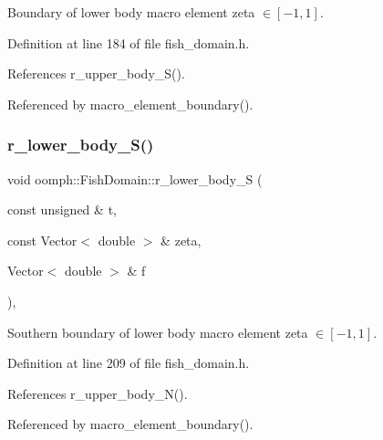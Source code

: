 Boundary of lower body macro element zeta $ \in [-1,1] $. 



Definition at line 184 of file fish\+\_\+domain.\+h.



References r\+\_\+upper\+\_\+body\+\_\+\+S().



Referenced by macro\+\_\+element\+\_\+boundary().

\mbox{\label{classoomph_1_1FishDomain_aa33b19ceef5cd574ee0a6756bcfc6da7}} 
\subsubsection{\texorpdfstring{r\+\_\+lower\+\_\+body\+\_\+\+S()}{r\_lower\_body\_S()}}
{\footnotesize\ttfamily void oomph\+::\+Fish\+Domain\+::r\+\_\+lower\+\_\+body\+\_\+S (\begin{DoxyParamCaption}\item[{const unsigned \&}]{t,  }\item[{const Vector$<$ double $>$ \&}]{zeta,  }\item[{Vector$<$ double $>$ \&}]{f }\end{DoxyParamCaption})\hspace{0.3cm}{\ttfamily [inline]}, {\ttfamily [private]}}



Southern boundary of lower body macro element zeta $\in [-1,1] $. 



Definition at line 209 of file fish\+\_\+domain.\+h.



References r\+\_\+upper\+\_\+body\+\_\+\+N().



Referenced by macro\+\_\+element\+\_\+boundary().

\mbox{\label{classoomph_1_1FishDomain_a4466e68eb38c1e931743db93af2e9ba9}} 
